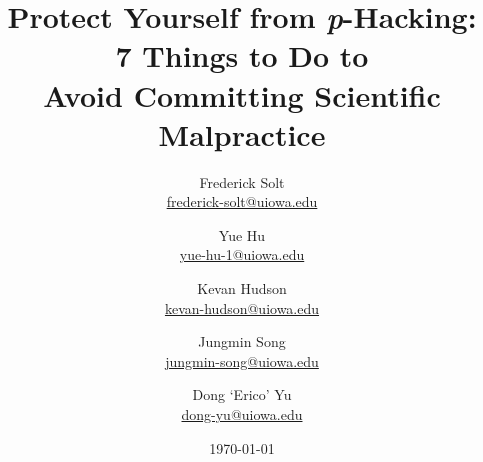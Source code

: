 \documentclass[12pt]{article}
\begin{document}
\title{Protect Yourself from \emph{p}-Hacking:\\ 7 Things to Do to\\ Avoid Committing Scientific Malpractice}		
\author{
    Frederick Solt\\
    \href{mailto:frederick-solt@uiowa.edu}{frederick-solt@uiowa.edu}
    \and
    Yue Hu\\
    \href{mailto:yue-hu-1@uiowa.edu}{yue-hu-1@uiowa.edu}
    \and
	Kevan Hudson\\
	\href{mailto:kevan-hudson@uiowa.edu}{kevan-hudson@uiowa.edu}
	\and
	Jungmin Song\\
    \href{mailto:jungmin-song@uiowa.edu}{jungmin-song@uiowa.edu}
	\and
	Dong `Erico' Yu\\
    \href{mailto:dong-yu@uiowa.edu}{dong-yu@uiowa.edu}
}
\date{\today}				
\maketitle

\begin{abstract}

\end{abstract}
\newpage


% 
% 
% 
% 
% 
% 
% 
% 

\newpage
\pagebreak




\clearpage
\appendix
\appendixpage
\addappheadtotoc


\end{document}
